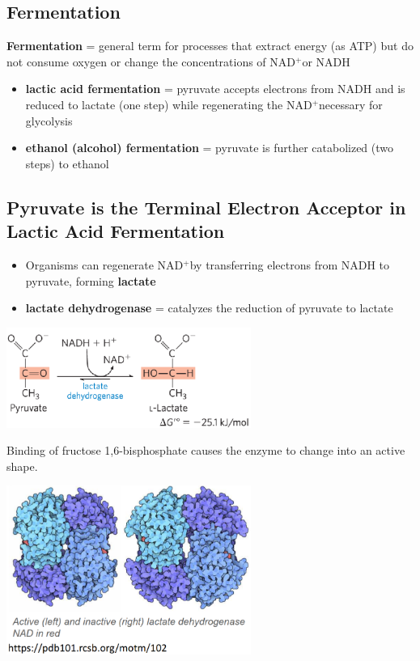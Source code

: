 \documentclass[10pt]{article}
\newcommand{\pc}{$^+$}
\begin{document}
\subsection*{Fermentation}
\textbf{Fermentation} = general term for processes that extract energy (as ATP) but do not consume oxygen or change the concentrations of NAD\pc or NADH
\begin{itemize}
	\item \textbf{lactic acid fermentation} = pyruvate accepts electrons from NADH and is reduced to lactate (one step) while regenerating the NAD\pc necessary for glycolysis
	\item \textbf{ethanol (alcohol) fermentation} = pyruvate is further catabolized (two steps) to ethanol
\end{itemize}

\subsection*{Pyruvate is the Terminal Electron Acceptor in Lactic Acid Fermentation}
\begin{itemize}
	\item Organisms can regenerate NAD\pc by transferring electrons from NADH to pyruvate, forming \textbf{lactate}
	\item \textbf{lactate dehydrogenase} = catalyzes the reduction of pyruvate to lactate
\end{itemize}
\begin{center} 
	\includegraphics*[width=0.6\textwidth]{L2_9.png}
\end{center}
Binding of fructose 1,6-bisphosphate causes the enzyme to change into an active shape.
\begin{center} 
	\includegraphics*[width=0.6\textwidth]{L2_10.png}
\end{center}
\end{document}
